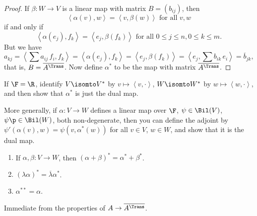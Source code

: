 \begin{proof}
	 If $\beta:W\to V$ is a linear map with matrix $B=(b_{ij})$, then %
	 \begin{equation*}
	 	\left\langle \alpha(v),w \right\rangle = \left\langle v, \beta(w) \right\rangle \text{ for all } v,w
	 \end{equation*}
	 if and only if
	 \begin{equation*}
	 	\left\langle \alpha(e_j),f_k \right\rangle = \left\langle e_j,\beta(f_k) \right\rangle \text{ for all } 0\leq j\leq n, 0\leq k\leq m. %
	 \end{equation*}
	 But we have
	 \begin{equation*}
	 	a_{kj}
		= \left\langle \textstyle\sum a_{ij}\,f_i, f_k \right\rangle
		= \left\langle \alpha(e_j),f_k \right\rangle
		= \left\langle e_j,\beta(f_k) \right\rangle
		= \left\langle e_j,\textstyle\sum b_{ik}\,e_i \right\rangle
		= \overline{b}_{jk},
	 \end{equation*}
	 that is, $B=\overline{A^\Trans}$. Now define $\alpha^*$ to be the map with matrix $\overline{A^\Trans}$. %
\end{proof}

\begin{exercise}
	If $\F=\R$, identify $V\isomto V^*$ by $v\mapsto \left\langle v,\cdot \right\rangle$, $W\isomto W^*$ by $w\mapsto \left\langle w,\cdot \right\rangle$, and then show that $\alpha^*$ is just the dual map. %
	
	More generally, if $\alpha:V\to W$ defines a linear map over $\F$, $\psi\in\Bil(V)$, $\psi\p\in\Bil(W)$, both non-degenerate, then you can define the adjoint by $\psi'(\alpha(v),w) = \psi(v,\alpha^*(w))$ for all $v\in V$, $w\in W$, and show that it is the dual map.  %
\end{exercise}

\begin{lemma}
\mbox{}
\begin{enumerate}
	\shortskip
	\item If $\alpha,\beta:V\to W$, then $(\alpha+\beta)^* = \alpha^* + \beta^*$.
	\item $\left( \lambda\alpha \right)^* = \overline{\lambda} \alpha^*$.
	\item $\alpha^{**} = \alpha$.
\end{enumerate}
\end{lemma}

\begin{proof*}
	Immediate from the properties of $A\to \overline{A^\Trans}$. %
\end{proof*}

